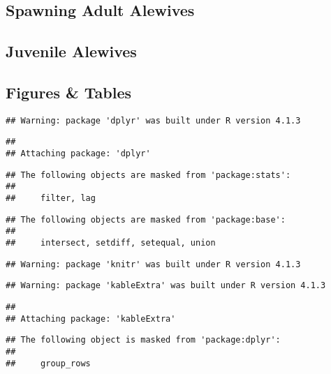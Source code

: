 \documentclass[
]{book}
\begin{document}
\hypertarget{spawning-adult-alewives-1}{%
\subsection{Spawning Adult Alewives}\label{spawning-adult-alewives-1}}

\hypertarget{juvenile-alewives}{%
\subsection{Juvenile Alewives}\label{juvenile-alewives}}

\hypertarget{figures-tables}{%
\subsection{Figures \& Tables}\label{figures-tables}}

\begin{verbatim}
## Warning: package 'dplyr' was built under R version 4.1.3
\end{verbatim}

\begin{verbatim}
## 
## Attaching package: 'dplyr'
\end{verbatim}

\begin{verbatim}
## The following objects are masked from 'package:stats':
## 
##     filter, lag
\end{verbatim}

\begin{verbatim}
## The following objects are masked from 'package:base':
## 
##     intersect, setdiff, setequal, union
\end{verbatim}

\begin{verbatim}
## Warning: package 'knitr' was built under R version 4.1.3
\end{verbatim}

\begin{verbatim}
## Warning: package 'kableExtra' was built under R version 4.1.3
\end{verbatim}

\begin{verbatim}
## 
## Attaching package: 'kableExtra'
\end{verbatim}

\begin{verbatim}
## The following object is masked from 'package:dplyr':
## 
##     group_rows
\end{verbatim}
\end{document}
